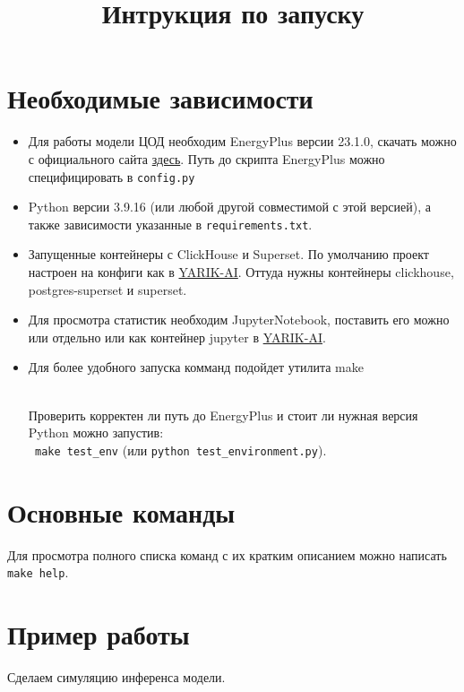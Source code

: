 \documentclass{article}
\title{Интрукция по запуску}
\date{}
\begin{document}
\maketitle

\section*{Необходимые зависимости}

\begin{itemize}
\item {Для работы модели ЦОД необходим EnergyPlus версии 23.1.0, скачать можно с официального сайта \href{https://energyplus.net/downloads}{здесь}. Путь до скрипта EnergyPlus можно специфицировать в \Verb+config.py+}

\item{Python версии 3.9.16 (или любой другой совместимой с этой версией), а также зависимости указанные в \Verb+requirements.txt+.}

\item {Запущенные контейнеры с ClickHouse и Superset. По умолчанию проект настроен на конфиги как в \href{https://github.com/YARIK-AI/ML}{YARIK-AI}. Оттуда нужны контейнеры clickhouse, postgres-superset и superset.}

\item{Для просмотра статистик необходим JupyterNotebook, поставить его можно или отдельно или как контейнер jupyter в \href{https://github.com/YARIK-AI/ML}{YARIK-AI}.}

\item{Для более удобного запуска комманд подойдет утилита make}

\\
Проверить корректен ли путь до EnergyPlus и стоит ли нужная версия Python можно запустив:\\
\Verb+ make test_env+ (или \Verb+python test_environment.py+). 
\end{itemize}

\section*{Основные команды}
Для просмотра полного списка команд с их кратким описанием можно написать \Verb+make help+. 

\section*{Пример работы}
Сделаем симуляцию инференса модели.
\end{document}
